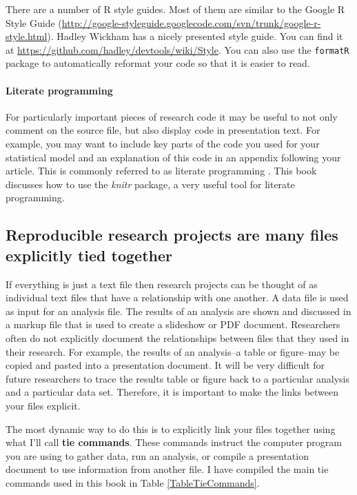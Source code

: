\documentclass[ChapterTOCs,krantz1]{krantz}\usepackage{graphicx, color}
\begin{document}
There are a number of R style guides. Most of them are similar to the Google R Style Guide  (\url{http://google-styleguide.googlecode.com/svn/trunk/google-r-style.html}). Hadley Wickham  has a nicely presented style guide. You can find it at \url{https://github.com/hadley/devtools/wiki/Style}. You can also use the {\tt{formatR}}  package to automatically reformat your code so that it is easier to read.

\paragraph{Literate programming}

For particularly important pieces of research code it may be useful to not only comment on the source file, but also display code in presentation text. For example, you may want to include key parts of the code you used for your statistical model and an explanation of this code in an appendix following your article. This is commonly referred to as literate programming  \cite{Knuth1992}. This book discusses how to use the {\emph{knitr}} package, a very useful tool for literate programming. 

\subsection{Reproducible research projects are many files explicitly tied together}

If everything is just a text file then research projects can be thought of as individual text files that have a relationship with one another. A data file is used as input for an analysis file. The results of an analysis are shown and discussed in a markup file that is used to create a slideshow or PDF document. Researchers often do not explicitly document the relationships between files that they used in their research. For example, the results of an analysis--a table or figure--may be copied and pasted into a presentation document. It will be very difficult for future researchers to trace the results table or figure back to a particular analysis and a particular data set. Therefore, it is important to make the links between your files explicit. 

The most dynamic way to do this is to explicitly link your files together using what I'll call {\bf{tie commands}}.  These commands instruct the computer program you are using to gather data, run an analysis, or compile a presentation document to use information from another file. I have compiled the main tie commands used in this book in Table \ref{TableTieCommands}.
\end{document}
